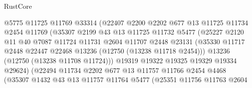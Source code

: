 \begin{lexlean}{RustCore}
\begin{coremodule}
                            @5775
                            @11725
                            @11769
                            @33314
                            (@22407
                              @2200
                              @2202
                              @677
                              @13
                              @11725
                              @11734
                              @2454
                              @11769
                              (@35307
                                @2199
                                @43
                                @13
                                @11725
                                @11732
                                @5477
                                (@25227
                                  @2120
                                  @11
                                  @40
                                  @7087
                                  @11724
                                  @11731
                                  @2604
                                  @11707
                                  @2448
                                  @23131
                                  (@35330
                                    @11717
                                    @2448
                                    @22447
                                    @22468
                                    @13236
                                    (@12750 (@13238 @11718 @2454)))
                                  @13236
                                  (@12750 (@13238 @11708 @11724)))
                                @19319
                                @19322
                                @19325
                                @19329
                                @19334
                                @29624)
                              (@22494
                                @11734
                                @2202
                                @677
                                @13
                                @11757
                                @11766
                                @2454
                                @4468
                                (@35307
                                  @1432
                                  @43
                                  @13
                                  @11757
                                  @11764
                                  @5477
                                  (@25351
                                    @11756
                                    @11763
                                    @2604

\end{coremodule}
\end{lexlean}
